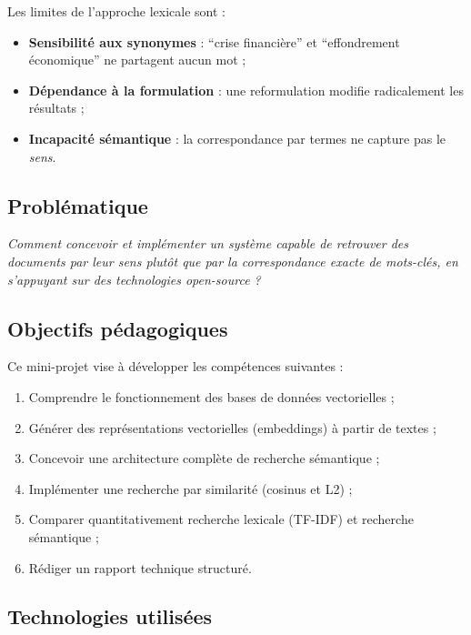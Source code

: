 \documentclass[12pt,a4paper]{article}
\begin{document}
Les limites de l'approche lexicale sont :
\begin{itemize}[noitemsep]
    \item \textbf{Sensibilit\'{e} aux synonymes} : ``crise financi\`{e}re'' et ``effondrement \'{e}conomique'' ne partagent aucun mot ;
    \item \textbf{D\'{e}pendance \`{a} la formulation} : une reformulation modifie radicalement les r\'{e}sultats ;
    \item \textbf{Incapacit\'{e} s\'{e}mantique} : la correspondance par termes ne capture pas le \textit{sens}.
\end{itemize}

\subsection{Probl\'{e}matique}

\textit{Comment concevoir et impl\'{e}menter un syst\`{e}me capable de retrouver des documents par leur sens plut\^{o}t que par la correspondance exacte de mots-cl\'{e}s, en s'appuyant sur des technologies open-source ?}

\subsection{Objectifs p\'{e}dagogiques}

Ce mini-projet vise \`{a} d\'{e}velopper les comp\'{e}tences suivantes :
\begin{enumerate}[noitemsep]
    \item Comprendre le fonctionnement des bases de donn\'{e}es vectorielles ;
    \item G\'{e}n\'{e}rer des repr\'{e}sentations vectorielles (embeddings) \`{a} partir de textes ;
    \item Concevoir une architecture compl\`{e}te de recherche s\'{e}mantique ;
    \item Impl\'{e}menter une recherche par similarit\'{e} (cosinus et L2) ;
    \item Comparer quantitativement recherche lexicale (TF-IDF) et recherche s\'{e}mantique ;
    \item R\'{e}diger un rapport technique structur\'{e}.
\end{enumerate}

\subsection{Technologies utilis\'{e}es}
\end{document}

